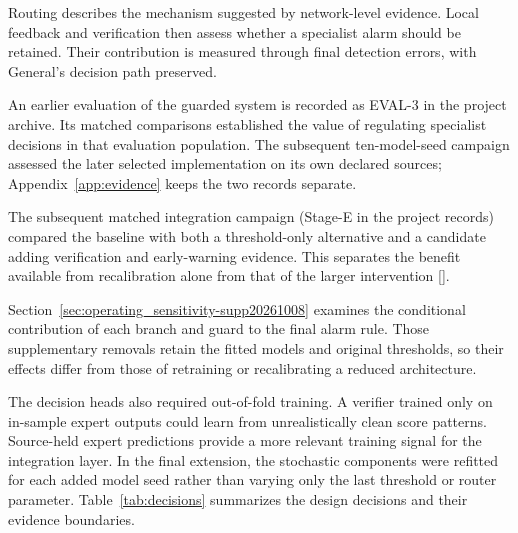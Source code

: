 Routing describes the mechanism suggested by network-level evidence. Local feedback and verification then assess whether a specialist alarm should be retained. Their contribution is measured through final detection errors, with General's decision path preserved.

An earlier evaluation of the guarded system is recorded as EVAL-3 in the project archive. Its matched comparisons established the value of regulating specialist decisions in that evaluation population. The subsequent ten-model-seed campaign assessed the later selected implementation on its own declared sources; Appendix~\ref{app:evidence} keeps the two records separate.

The subsequent matched integration campaign (Stage-E in the project records) compared the baseline with both a threshold-only alternative and a candidate adding verification and early-warning evidence. This separates the benefit available from recalibration alone from that of the larger intervention [].

Section~\ref{sec:operating_sensitivity-supp20261008} examines the conditional contribution of each branch and guard to the final alarm rule. Those supplementary removals retain the fitted models and original thresholds, so their effects differ from those of retraining or recalibrating a reduced architecture.

The decision heads also required out-of-fold training. A verifier trained only on in-sample expert outputs could learn from unrealistically clean score patterns. Source-held expert predictions provide a more relevant training signal for the integration layer. In the final extension, the stochastic components were refitted for each added model seed rather than varying only the last threshold or router parameter. Table~\ref{tab:decisions} summarizes the design decisions and their evidence boundaries.

